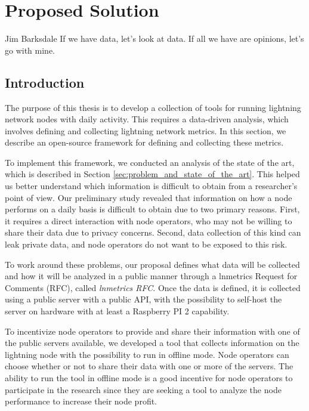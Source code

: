 \chapter{Proposed Solution}\label{chap:propsol}

\begin{chapquote}{Jim Barksdale}
If we have data, let’s look at data. If all we have are opinions, let’s go with mine.
\end{chapquote}

\section{Introduction}

The purpose of this thesis is to develop a collection of tools for running lightning network 
nodes with daily activity. This requires a data-driven analysis, which involves defining 
and collecting lightning network metrics. In this section, we describe an open-source 
framework for defining and collecting these metrics.

To implement this framework, we conducted an analysis of the state of the art, 
which is described in Section \ref{sec:problem_and_state_of_the_art}. This helped us 
better understand which information is difficult to obtain from a researcher's point 
of view. Our preliminary study revealed that information on how a node performs on a 
daily basis is difficult to obtain due to two primary reasons. First, it requires a direct 
interaction with node operators, who may not be willing to share their data due to 
privacy concerns. Second, data collection of this kind can leak private data, 
and node operators do not want to be exposed to this risk.

To work around these problems, our proposal defines what data will be collected 
and how it will be analyzed in a public manner through a lnmetrics Request for Comments (RFC), 
called \emph{lnmetrics RFC}. Once the data is defined, it is collected using a public 
server with a public API, with the possibility to self-host the server on hardware 
with at least a Raspberry PI 2 capability.

To incentivize node operators to provide and share their information with one
of the public servers available, we developed a tool that collects information on 
the lightning node with the possibility to run in offline mode. Node operators can 
choose whether or not to share their data with one or more of the servers. The ability 
to run the tool in offline mode is a good incentive for node operators to participate 
in the research since they are seeking a tool to analyze the node performance to 
increase their node profit.

